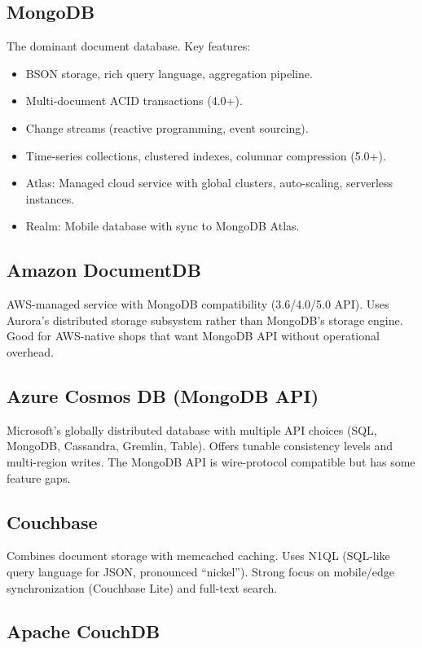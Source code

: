 \documentclass[12pt,a4paper]{article}
\begin{document}
\subsection{MongoDB}

The dominant document database. Key features:
\begin{itemize}[noitemsep]
    \item BSON storage, rich query language, aggregation pipeline.
    \item Multi-document ACID transactions (4.0+).
    \item Change streams (reactive programming, event sourcing).
    \item Time-series collections, clustered indexes, columnar compression (5.0+).
    \item Atlas: Managed cloud service with global clusters, auto-scaling, serverless instances.
    \item Realm: Mobile database with sync to MongoDB Atlas.
\end{itemize}

\subsection{Amazon DocumentDB}

AWS-managed service with MongoDB compatibility (3.6/4.0/5.0 API). Uses Aurora's distributed storage subsystem rather than MongoDB's storage engine. Good for AWS-native shops that want MongoDB API without operational overhead.

\subsection{Azure Cosmos DB (MongoDB API)}

Microsoft's globally distributed database with multiple API choices (SQL, MongoDB, Cassandra, Gremlin, Table). Offers tunable consistency levels and multi-region writes. The MongoDB API is wire-protocol compatible but has some feature gaps.

\subsection{Couchbase}

Combines document storage with memcached caching. Uses N1QL (SQL-like query language for JSON, pronounced ``nickel''). Strong focus on mobile/edge synchronization (Couchbase Lite) and full-text search.

\subsection{Apache CouchDB}
\end{document}
